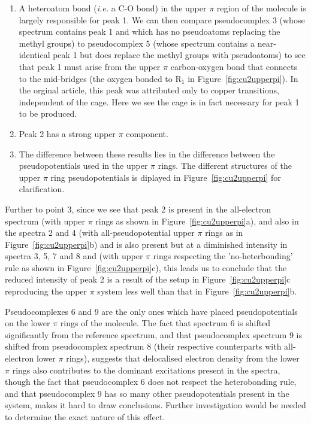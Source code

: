 \documentclass[aip,reprint,nofootinbib]{revtex4-1}
\begin{document}
\begin{enumerate}
\item A heteroatom bond (\emph{i.e.} a C-O bond) in the upper $\pi$ region of the molecule is largely responsible for peak 1. We can then compare pseudocomplex 3 (whose spectrum contains peak 1 and which has no pseudoatoms replacing the methyl groups) to pseudocomplex 5 (whose spectrum contains a near-identical peak 1 but does replace the methyl groups with pseudoatoms) to see that peak 1 must arise from the upper $\pi$ carbon-oxygen bond that connects to the mid-bridges (the oxygen bonded to R$_1$ in Figure~\ref{fig:cu2upperpi}). In the orginal article, this peak was attributed only to copper transitions, independent of the cage. Here we see the cage is in fact necessary for peak 1 to be produced.

\item Peak 2 has a strong upper $\pi$ component.
 
\item The difference between these results lies in the difference between the pseudopotentials used in the upper $\pi$ rings. The different structures of the upper $\pi$ ring pseudopotentials is diplayed in Figure~\ref{fig:cu2upperpi} for clarification. 
\end{enumerate}

Further to point 3, since we see that peak 2 is present in the all-electron spectrum (with upper $\pi$ rings as shown in Figure~\ref{fig:cu2upperpi}a), and also in the spectra 2 and 4 (with all-pseudopotential upper $\pi$ rings as in Figure~\ref{fig:cu2upperpi}b) and is also present but at a diminished intensity in spectra 3, 5, 7 and 8 and (with upper $\pi$ rings respecting the 'no-heterbonding' rule as shown in Figure~\ref{fig:cu2upperpi}c), this leads us to conclude that the reduced intensity of peak 2 is a result of the setup in Figure~\ref{fig:cu2upperpi}c reproducing the upper $\pi$ system less well than that in Figure~\ref{fig:cu2upperpi}b. 

Pseudocomplexes 6 and 9 are the only ones which have placed pseudopotentials on the lower $\pi$ rings of the molecule. The fact that spectrum 6 is shifted significantly from the reference spectrum, and that pseudocomplex spectrum 9 is shifted from pseudocomplex spectrum 8 (their respective counterparts with all-electron lower $\pi$ rings), suggests that delocalised electron density from the lower $\pi$ rings also contributes to the dominant excitations present in the spectra, though the fact that pseudocomplex 6 does not respect the heterobonding rule, and that pseudocomplex 9 has so many other pseudopotentials present in the system, makes it hard to draw conclusions. Further investigation would be needed to determine the exact nature of this effect.
\end{document}
